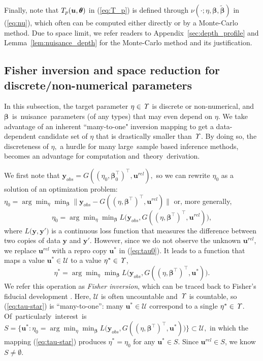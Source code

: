 \documentclass[12pt]{article}
\theoremstyle{shortspace}
\def\*#1{\bm{#1}}
\def\btheta{\mathop{\theta\kern-.45em\hbox{$\theta$}}\nolimits}
\begin{document}
Finally, 
note that 
$T_p(\*u, \btheta)$ in (\ref{eq:T_p}) is defined through $\nu(\cdot; \eta, \*\beta, \widetilde {\*\beta})$ in (\ref{eq:nu}), which often can be computed either directly or by a Monte-Carlo method. Due to space limit, we refer readers to Appendix~\ref{sec:depth_profile} and Lemma~\ref{lem:nuisance_depth} for the Monte-Carlo method and its justification. 
 



\subsection{\hspace{-3mm} Fisher inversion and
space reduction for discrete/non-numerical parameters}
\label{sec:candidate_general}

In this subsection,  
 the target parameter $\eta \in {\it \Upsilon}$ is  discrete or non-numerical,  
and $\*\beta$~is~nuisance~parameters (of any types) that may even depend on $\eta$. We take advantage of an inherent ``many-to-one" inversion mapping to get a data-dependent candidate set of $\eta$
that is drastically smaller than ${\it \Upsilon}$. 
 By doing so, the discreteness of $\eta,$ a hurdle for many large~sample based inference methods, becomes
an advantage for computation and~theory~derivation.


We first note that $\*y_{obs} = G((\eta_0, \*\beta_0^\top)^\top,  \*u^{rel}),$ 
so we can rewrite $\eta_0$ as a solution of an optimization problem: 
$\eta_0 = \arg \min\nolimits_{\eta} \min\nolimits_{\*\beta}\|\*y_{obs} - G((\eta, \*\beta^\top)^\top, \*u^{rel})\|$ or, more generally, 
\begin{equation}
    \eta_0 = \arg \min\nolimits_{\eta} \min\nolimits_{\*\beta}L\big(\*y_{obs}, G((\eta, \*\beta^\top)^\top, \*u^{rel})\big),
    \label{eq:tau0}
\end{equation}
where $L\big(\*y, \*y'\big)$ is a continuous loss function that measures the difference between two copies of data $\*y$ and $\*y'$. However, since we do not observe the unknown  $\*u^{rel}$, we replace $\*u^{rel}$ with a repro copy $\*u^*$ in (\ref{eq:tau0}). It leads to a function that maps a value $\*u^* \in {\mathcal U}$ to a value $\eta^* \in {\it \Upsilon}$,
\begin{equation}
   \eta^* = \arg \min\nolimits_{\eta} \min\nolimits_{\*\beta}L\big(\*y_{obs}, G((\eta, \*\beta^\top)^\top, \*u^*)\big).
    \label{eq:tau-star} 
\end{equation} 
We refer this operation as {\it Fisher inversion}, which can be traced back to Fisher's fiducial development \citep[cf.,][]{Thornton2022}. 
Here,
${\mathcal U}$ is often uncountable and ${\it \Upsilon}$ is countable, so (\ref{eq:tau-star}) is ``many-to-one'': many $\*u^* \in {\mathcal U}$ correspond to a single $\eta^* \in {\it \Upsilon}$. Of~particularly~interest~is 
$S =\big\{\*u^*: \eta_0 = \arg \min\nolimits_{\eta} \min\nolimits_{\*\beta}L\big(\*y_{obs}, G((\eta, \*\beta^\top)^\top, \*u^*)\big)\big\} \subset {\mathcal U},$
in which the mapping (\ref{eq:tau-star}) produces $\eta^* = \eta_0$ for any $\*u^* \in S$. Since 
$\*u^{rel} \in S$, we know~$S \not = \emptyset$. 
\end{document}
